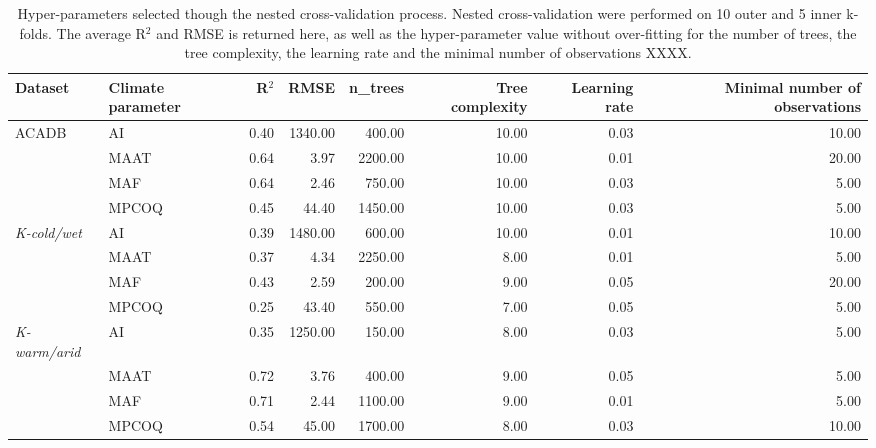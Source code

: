 \begin{table}[ht]
\centering
\caption{Hyper-parameters selected though the nested cross-validation process. Nested cross-validation were performed on 10 outer and 5 inner k-folds. The average R$^2$ and RMSE is returned here, as well as the hyper-parameter value without over-fitting for the number of trees, the tree complexity, the learning rate and the minimal number of observations XXXX.} 
\label{FT_table}
\begin{tabular}{llrrrrrr}
  \toprule
Dataset & Climate parameter & R$^2$ & RMSE & n_{trees} & Tree complexity & Learning rate & Minimal number of observations \\ 
  \midrule
ACADB & AI & 0.40 & 1340.00 & 400.00 & 10.00 & 0.03 & 10.00 \\ 
   & MAAT & 0.64 & 3.97 & 2200.00 & 10.00 & 0.01 & 20.00 \\ 
   & MAF & 0.64 & 2.46 & 750.00 & 10.00 & 0.03 & 5.00 \\ 
   & MPCOQ & 0.45 & 44.40 & 1450.00 & 10.00 & 0.03 & 5.00 \\ 
   \midrule
\textit{K-cold/wet} & AI & 0.39 & 1480.00 & 600.00 & 10.00 & 0.01 & 10.00 \\ 
   & MAAT & 0.37 & 4.34 & 2250.00 & 8.00 & 0.01 & 5.00 \\ 
   & MAF & 0.43 & 2.59 & 200.00 & 9.00 & 0.05 & 20.00 \\ 
   & MPCOQ & 0.25 & 43.40 & 550.00 & 7.00 & 0.05 & 5.00 \\ 
   \midrule
\textit{K-warm/arid} & AI & 0.35 & 1250.00 & 150.00 & 8.00 & 0.03 & 5.00 \\ 
   & MAAT & 0.72 & 3.76 & 400.00 & 9.00 & 0.05 & 5.00 \\ 
   & MAF & 0.71 & 2.44 & 1100.00 & 9.00 & 0.01 & 5.00 \\ 
   \midrule
 & MPCOQ & 0.54 & 45.00 & 1700.00 & 8.00 & 0.03 & 10.00 \\ 
   \bottomrule
\end{tabular}
\end{table}
